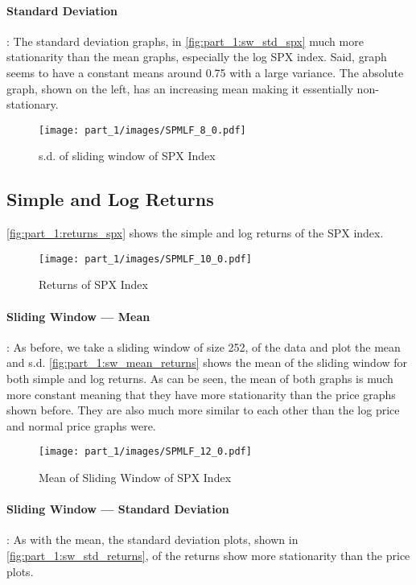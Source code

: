\paragraph{Standard Deviation}: The standard deviation graphs, in \autoref{fig:part_1:sw_std_spx}  much more stationarity than the mean graphs, especially the log SPX index. Said, graph seems to have a constant means around 0.75 with a large variance. The absolute graph, shown on the left, has an increasing mean making it essentially non-stationary.

\begin{figure}[!htb]
    \centering
    \texttt{[image: part\_1/images/SPMLF\_8\_0.pdf]}
    \caption{s.d. of sliding window of SPX Index}
    \label{fig:part_1:sw_std_spx}
\end{figure}

\subsection{Simple and Log Returns}

\autoref{fig:part_1:returns_spx} shows the simple and log returns of the SPX index.

\begin{figure}[!htb]
    \centering
    \texttt{[image: part\_1/images/SPMLF\_10\_0.pdf]}
    \caption{Returns of SPX Index}
    \label{fig:part_1:returns_spx}
\end{figure}

\paragraph{Sliding Window — Mean}: As before, we take a sliding window of size 252, of the data and plot the mean and s.d. \autoref{fig:part_1:sw_mean_returns} shows the mean of the sliding window for both simple and log returns. As can be seen, the mean of both graphs is much more constant meaning that they have more stationarity than the price graphs shown before. They are also much more similar to each other than the log price and normal price graphs were.

\begin{figure}[!htb]
    \centering
    \texttt{[image: part\_1/images/SPMLF\_12\_0.pdf]}
    \caption{Mean of Sliding Window of SPX Index}
    \label{fig:part_1:sw_mean_returns}
\end{figure}

\paragraph{Sliding Window — Standard Deviation}: As with the mean, the standard deviation plots, shown in \autoref{fig:part_1:sw_std_returns}, of the returns show more stationarity than the price plots.

